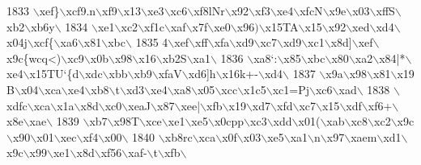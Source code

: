 \begin{DoxyCode}
1833 \textcolor{stringliteral}{\(\backslash\)xef\}\(\backslash\)xcf9.n\(\backslash\)xf9\(\backslash\)x13\(\backslash\)xe3\(\backslash\)xc6\(\backslash\)xf8lNr\(\backslash\)x92\(\backslash\)xf3\(\backslash\)xe4\(\backslash\)xfcN\(\backslash\)x9e\(\backslash\)x03\(\backslash\)xffS\(\backslash\)xb2\(\backslash\)xb6y\(\backslash\)}
1834 \textcolor{stringliteral}{\(\backslash\)xe1\(\backslash\)xc2\(\backslash\)xf1c\(\backslash\)xaf\(\backslash\)x7f\(\backslash\)xe0\(\backslash\)x96$)$\(\backslash\)x15TA\(\backslash\)x15\(\backslash\)x92\(\backslash\)xed\(\backslash\)xd4\(\backslash\)x04j\(\backslash\)xcf\{\(\backslash\)xa6\(\backslash\)x81\(\backslash\)xbc\(\backslash\)}
1835 \textcolor{stringliteral}{4\(\backslash\)xef\(\backslash\)xff\(\backslash\)xfa\(\backslash\)xd9\(\backslash\)xc7\(\backslash\)xd9\(\backslash\)xc1\(\backslash\)x8d]\(\backslash\)xef\(\backslash\)x9c\{wcq<)\(\backslash\)xc9\(\backslash\)x0b\(\backslash\)x98\(\backslash\)x16\(\backslash\)xb2S\(\backslash\)xa1\(\backslash\)}
1836 \textcolor{stringliteral}{\(\backslash\)xa8`:\(\backslash\)x85\(\backslash\)xbc\(\backslash\)x80\(\backslash\)xa2\(\backslash\)x84|*\(\backslash\)xe4\(\backslash\)x15TU`\{d\(\backslash\)xdc\(\backslash\)xbb\(\backslash\)xb9\(\backslash\)xfaV\(\backslash\)xd6]h\(\backslash\)x16k+-\(\backslash\)xd4\(\backslash\)}
1837 \textcolor{stringliteral}{\(\backslash\)x9a\(\backslash\)x98\(\backslash\)x81\(\backslash\)x19 B\(\backslash\)x04\(\backslash\)xca\(\backslash\)xe4\(\backslash\)xb8\(\backslash\)t\(\backslash\)xd3\(\backslash\)xe4\(\backslash\)xa8\(\backslash\)x05\(\backslash\)xcc\(\backslash\)x1c5\(\backslash\)xc1=Pj\(\backslash\)xc6\(\backslash\)xad\(\backslash\)}
1838 \textcolor{stringliteral}{\(\backslash\)xdfc\(\backslash\)xca\(\backslash\)x1a\(\backslash\)x8d\(\backslash\)xc0\(\backslash\)xeaJ\(\backslash\)x87\(\backslash\)xee|\(\backslash\)xfb\(\backslash\)x19\(\backslash\)xd7\(\backslash\)xfd\(\backslash\)xc7\(\backslash\)x15\(\backslash\)xdf\(\backslash\)xf6+\(\backslash\)x8e\(\backslash\)xae\(\backslash\)}
1839 \textcolor{stringliteral}{\(\backslash\)xb7\(\backslash\)x98T\(\backslash\)xce\(\backslash\)xe1\(\backslash\)xe5\(\backslash\)x0cpp\(\backslash\)xc3\(\backslash\)xdd\(\backslash\)x01(\(\backslash\)xab\(\backslash\)xc8\(\backslash\)xc2\(\backslash\)x9c\(\backslash\)x90\(\backslash\)x01\(\backslash\)xec\(\backslash\)xf4\(\backslash\)x00\(\backslash\)}
1840 \textcolor{stringliteral}{\(\backslash\)xb8rc\(\backslash\)xca\(\backslash\)x0f\(\backslash\)x03\(\backslash\)xe5\(\backslash\)xa1\(\backslash\)n\(\backslash\)x97\(\backslash\)xaem\(\backslash\)xd1\(\backslash\)x9c\(\backslash\)x99\(\backslash\)xe1\(\backslash\)x8d\(\backslash\)xf56\(\backslash\)xaf-\(\backslash\)t\(\backslash\)xfb\(\backslash\)}

\end{DoxyCode}
